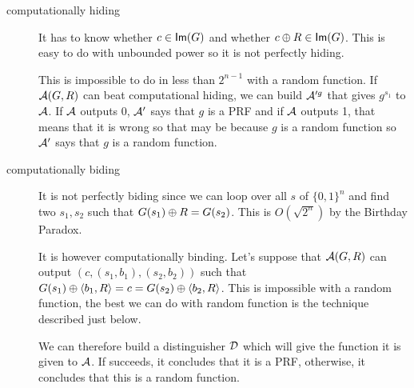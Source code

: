 \newape
\begin{solution}
  \begin{description}
    \item[computationally hiding]
      It has to know whether $c \in \operatorname{\mathsf{Im}}(G)$ and whether $c \oplus R \in \operatorname{\mathsf{Im}}(G)$.
      This is easy to do with unbounded power so it is not perfectly hiding.

      This is impossible to do in less than $2^{n-1}$ with a random function.
      If $\mathcal{A}(G,R)$ can beat computational hiding, we can build $\mathcal{A}'^g$ that gives $g^{s_1}$ to $\mathcal{A}$.
      If $\mathcal{A}$ outputs 0, $\mathcal{A}'$ says that $g$ is a PRF and if $\mathcal{A}$ outputs 1,
      that means that it is wrong so that may be because $g$ is a random function
      so $\mathcal{A}'$ says that $g$ is a random function.
    \item[computationally biding]
      It is not perfectly biding since we can loop over all $s$ of $\{0,1\}^n$ and find two $s_1,s_2$ such
      that $G(s_1) \oplus R = G(s_2)$.
      This is $O(\sqrt{2^n})$ by the Birthday Paradox.

      It is however computationally binding.
      Let's suppose that $\mathcal{A}(G,R)$ can output $(c, (s_1,b_1), (s_2, b_2))$ such that
      $G(s_1) \oplus \langle b_1,R \rangle = c = G(s_2) \oplus \langle b_2,R \rangle$.
      This is impossible with a random function, the best we can do with random function is the technique described just below.

      We can therefore build a distinguisher $\mathcal{D}$ which will give the function it is given to $\mathcal{A}$.
      If succeeds, it concludes that it is a PRF, otherwise, it concludes that this is a random function.
  \end{description}
\end{solution}

